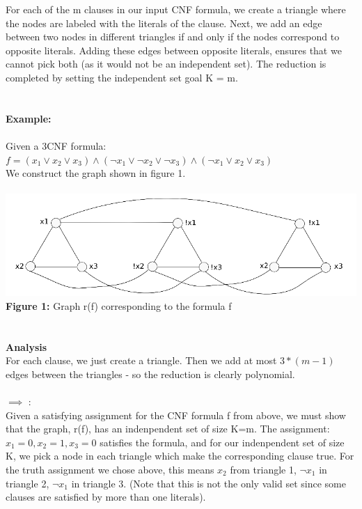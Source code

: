 \documentclass{article}
\begin{document}
For each of the m clauses in our input CNF formula, we create a triangle where the nodes are labeled with the literals of the clause. Next, we add an edge between two nodes in different triangles if and only if the nodes correspond to opposite literals. Adding these edges between opposite literals, ensures that we cannot pick both (as it would not be an independent set). The reduction is completed by setting the independent set goal K = m. \\\\\\
\textbf{Example:}\\\\
Given a 3CNF formula:  $f =  (x_1 \lor x_2 \lor x_3) \land (\lnot x_1 \lor \lnot x_2 \lor \lnot x_3) \land (\lnot x_1 \lor x_2 \lor x_3)$\\
We construct the graph shown in figure 1. \\\\
\includegraphics[scale=0.5]{independentset}
\textbf{Figure 1:} Graph r(f) corresponding to the formula f\\\\\\
\textbf{Analysis}\\
For each clause, we just create a triangle. Then we add at most $3 * (m-1)$ edges between the triangles - so the reduction is clearly polynomial.
\\\\
$\implies$ :\\ Given a satisfying assignment for the CNF formula f from above, we must show that the graph, r(f), has an indenpendent set of size K=m. The assignment: $x_1 = 0, x_2 = 1, x_3 = 0$ satisfies the formula, and for our indenpendent set of size K, we pick a node in each triangle which make the corresponding clause true. For the truth assignment we chose above, this means $x_2$ from triangle 1, $\lnot x_1$ in triangle 2, $\lnot x_1$ in triangle 3. (Note that this is not the only valid set since some clauses are satisfied by more than one literals).
\\\\
\end{document}
